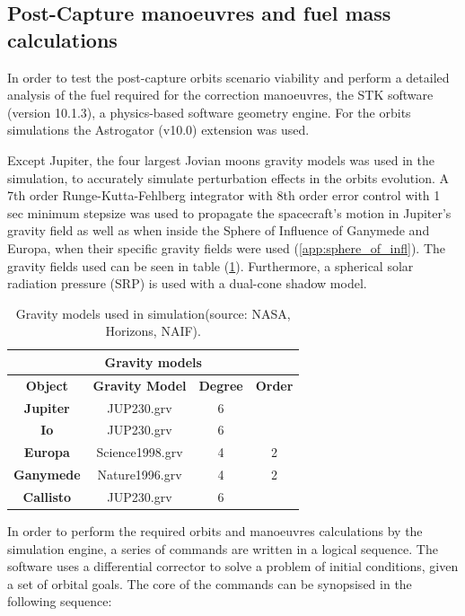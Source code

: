 \subsection{Post-Capture manoeuvres and fuel mass calculations}
In order to test the post-capture orbits scenario viability and perform a detailed analysis of the fuel required for the correction manoeuvres, the STK software (version 10.1.3), a physics-based software geometry engine. For the orbits simulations the Astrogator (v10.0) extension was used. 

Except Jupiter, the four largest Jovian moons gravity models was used in the simulation, to accurately simulate perturbation effects in the orbits evolution. A 7th order Runge-Kutta-Fehlberg integrator with 8th order error control with 1 sec minimum stepsize was used to propagate the spacecraft's motion in Jupiter's gravity field as well as when inside the Sphere of Influence of Ganymede and Europa, when their specific gravity fields were used (\ref{app:sphere_of_infl}). The gravity fields used can be seen in table (\ref{tab:gravf}). Furthermore, a spherical solar radiation pressure (SRP) is used with a dual-cone shadow model.

\begin{table}[htb]
  \centering
    \begin{tabular}{|c|c|c|c|}
    \hline
    \multicolumn{4}{|c|}{\textbf{Gravity models}} \bigstrut\\
    \hline
    \textbf{Object} & \textbf{Gravity Model} & \textbf{Degree} & \textbf{Order} \bigstrut\\
    \hline
    \textbf{Jupiter} & JUP230.grv & 6     &  \bigstrut\\
    \hline
    \textbf{Io} & JUP230.grv & 6     &  \bigstrut\\
    \hline
    \textbf{Europa} & Science1998.grv & 4     & 2 \bigstrut\\
    \hline
    \textbf{Ganymede} & Nature1996.grv & 4     & 2 \bigstrut\\
    \hline
    \textbf{Callisto} & JUP230.grv & 6     &  \bigstrut\\
    \hline
    \end{tabular}%
    \caption{Gravity models used in simulation(source: NASA, Horizons, NAIF).\cite{Gravm}}\label{tab:gravf}
\end{table}%

In order to perform the required orbits and manoeuvres calculations by the simulation engine, a series of commands are written in a logical sequence. The software uses a differential corrector to solve a problem of initial conditions, given a set of orbital goals. 
The core of the commands can be synopsised in the following sequence:

